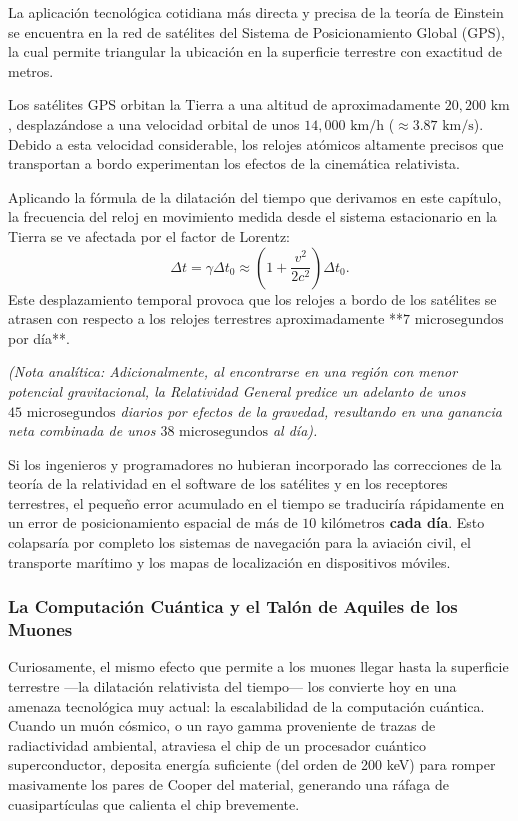 \documentclass[11pt,a4paper]{book}
\begin{document}
La aplicación tecnológica cotidiana más directa y precisa de la teoría de Einstein se encuentra en la red de satélites del Sistema de Posicionamiento Global (GPS), la cual permite triangular la ubicación en la superficie terrestre con exactitud de metros.

Los satélites GPS orbitan la Tierra a una altitud de aproximadamente $20,200 \text{ km}$, desplazándose a una velocidad orbital de unos $14,000 \text{ km/h}$ ($\approx 3.87 \text{ km/s}$). Debido a esta velocidad considerable, los relojes atómicos altamente precisos que transportan a bordo experimentan los efectos de la cinemática relativista. 

Aplicando la fórmula de la dilatación del tiempo que derivamos en este capítulo, la frecuencia del reloj en movimiento medida desde el sistema estacionario en la Tierra se ve afectada por el factor de Lorentz:
\begin{equation}
    \Delta t = \gamma \Delta t_0 \approx \left(1 + \frac{v^2}{2c^2}\right) \Delta t_0.
\end{equation}
Este desplazamiento temporal provoca que los relojes a bordo de los satélites se atrasen con respecto a los relojes terrestres aproximadamente **$7 \text{ microsegundos}$ por día**. 

\textit{(Nota analítica: Adicionalmente, al encontrarse en una región con menor potencial gravitacional, la Relatividad General predice un adelanto de unos $45 \text{ microsegundos}$ diarios por efectos de la gravedad, resultando en una ganancia neta combinada de unos $38 \text{ microsegundos}$ al día).}

Si los ingenieros y programadores no hubieran incorporado las correcciones de la teoría de la relatividad en el software de los satélites y en los receptores terrestres, el pequeño error acumulado en el tiempo se traduciría rápidamente en un error de posicionamiento espacial de más de \textbf{$10 \text{ kilómetros}$ cada día}. Esto colapsaría por completo los sistemas de navegación para la aviación civil, el transporte marítimo y los mapas de localización en dispositivos móviles.



\subsubsection{La Computación Cuántica y el Talón de Aquiles de los Muones}

Curiosamente, el mismo efecto que permite a los muones llegar hasta la superficie terrestre
—la dilatación relativista del tiempo— los convierte hoy en una amenaza tecnológica muy
actual: la escalabilidad de la computación cuántica. Cuando un muón cósmico, o un rayo gamma
proveniente de trazas de radiactividad ambiental, atraviesa el chip de un procesador cuántico
superconductor, deposita energía suficiente (del orden de 200 keV) para romper masivamente los
pares de Cooper del material, generando una ráfaga de cuasipartículas que calienta el chip
brevemente.
\end{document}
